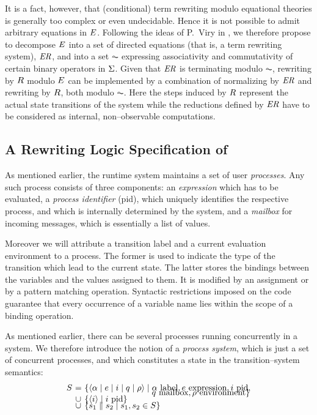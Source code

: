 \documentclass{entcs}
\begin{document}
It is a fact, however, that (conditional) term rewriting modulo equational 
theories is generally too complex or even undecidable. Hence it is not
possible to admit arbitrary equations in $E$. Following the ideas of 
P.~Viry in \cite{Vir94}, we therefore propose to decompose $E$ into a 
set of directed equations 
(that is, a term rewriting system), $\mathit{ER}$, and into a set $\AC$ expressing
associativity and commutativity of certain binary operators in $\Sigma$. Given 
that $\mathit{ER}$ is terminating modulo $\AC$, 
rewriting by $R$ modulo $E$ can be implemented by a combination of
normalizing by $\mathit{ER}$ and rewriting by $R$, both modulo $\AC$. Here
the steps induced by $R$ represent the actual state transitions of
the system while the reductions defined by $\mathit{ER}$ have to be considered as
internal, non--observable computations.


\subsection{A Rewriting Logic Specification of \Erlang}

As mentioned earlier, the \Erlang runtime system 
maintains a set of user \emph{processes}.
Any such process consists of three components:
an \Erlang \emph{expression} which has to be evaluated,
a \emph{process identifier} (pid), which uniquely identifies the
respective process, and which is internally determined by the system, and
a \emph{mailbox} for incoming messages, which is essentially a list of
\Erlang values.

Moreover we will attribute a transition label
and a current evaluation environment to a process. The former is used to
indicate the type of the transition which lead to the current state. The
latter stores the bindings between the \Erlang variables and
the values assigned to them. It is modified by
an assignment or by a pattern matching
operation. Syntactic restrictions imposed on the code guarantee that every
occurrence of a variable name lies within the scope of a binding
operation.

As mentioned earlier, there can be several processes running concurrently
in a system. We therefore introduce the notion of a \emph{process system},
which is just a set of concurrent processes, and which constitutes a state
in the transition--system semantics:
\[\begin{array}[t]{@{}r@{~}c@{~}l@{}}
    S & = &
    \{\process{\alpha}{e}{i}{q}{\rho} \mid
    \begin{array}[t]{@{}l@{}}
      \alpha \mbox{ label}, e \mbox{ expression}, i \mbox{ pid}, \\[-1.5ex]
      q \mbox{ mailbox}, \rho \mbox{ environment}\}
    \end{array} \\[-1ex]
    & \cup &
    \{\dead{i} \mid i \mbox{ pid}\} \\[-1ex]
    & \cup &
    \{s_1 \parallel s_2 \mid s_1, s_2 \in S\}
  \end{array}
\]
\end{document}
